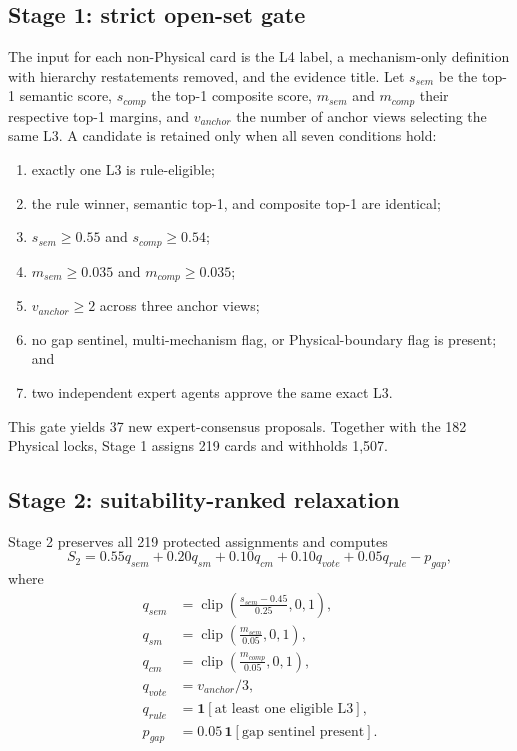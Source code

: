 \documentclass[11pt,a4paper]{article}
\begin{document}
\subsection{Stage 1: strict open-set gate}

The input for each non-Physical card is the L4 label, a mechanism-only
definition with hierarchy restatements removed, and the evidence title. Let
$s_{sem}$ be the top-1 semantic score, $s_{comp}$ the top-1 composite score,
$m_{sem}$ and $m_{comp}$ their respective top-1 margins, and $v_{anchor}$ the
number of anchor views selecting the same L3. A candidate is retained only when
all seven conditions hold:

\begin{enumerate}[leftmargin=2em]
  \item exactly one L3 is rule-eligible;
  \item the rule winner, semantic top-1, and composite top-1 are identical;
  \item $s_{sem}\geq0.55$ and $s_{comp}\geq0.54$;
  \item $m_{sem}\geq0.035$ and $m_{comp}\geq0.035$;
  \item $v_{anchor}\geq2$ across three anchor views;
  \item no gap sentinel, multi-mechanism flag, or Physical-boundary flag is present; and
  \item two independent expert agents approve the same exact L3.
\end{enumerate}

This gate yields 37 new expert-consensus proposals. Together with the 182
Physical locks, Stage 1 assigns 219 cards and withholds 1,507.

\subsection{Stage 2: suitability-ranked relaxation}

Stage 2 preserves all 219 protected assignments and computes
\begin{equation}
S_2=0.55q_{sem}+0.20q_{sm}+0.10q_{cm}+0.10q_{vote}+0.05q_{rule}-p_{gap},
\end{equation}
where
\begin{align}
q_{sem}&=\operatorname{clip}\left(\frac{s_{sem}-0.45}{0.25},0,1\right),\\
q_{sm}&=\operatorname{clip}\left(\frac{m_{sem}}{0.05},0,1\right),\\
q_{cm}&=\operatorname{clip}\left(\frac{m_{comp}}{0.05},0,1\right),\\
q_{vote}&=v_{anchor}/3,\\
q_{rule}&=\mathbf{1}[\text{at least one eligible L3}],\\
p_{gap}&=0.05\,\mathbf{1}[\text{gap sentinel present}].
\end{align}
\end{document}
